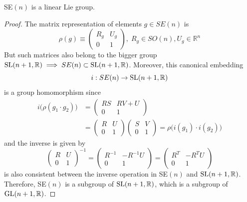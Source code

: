   \begin{proposition}
    SE$(n)$ is a linear Lie group. 
  \end{proposition}
  \begin{proof}
    The matrix representation of elements $g \in SE(n)$ is 
    \begin{equation}
      \rho(g) \equiv \begin{pmatrix}
      R_g & U_g \\ 0 & 1
      \end{pmatrix}, \; R_g \in SO(n), U_g \in \mathbb{R}^n
    \end{equation}
    But such matrices also belong to the bigger group $\operatorname{SL}(n+1, \mathbb{R}) \implies SE(n) \subset \operatorname{SL}(n+1, \mathbb{R})$. Moreover, this canonical embedding 
    \begin{equation}
      i: SE(n) \rightarrow \operatorname{SL}(n+1, \mathbb{R})
    \end{equation}
    is a group homomorphism since
    \begin{align*}
      i\big( \rho(g_1 \cdot g_2) \big) & = \begin{pmatrix}
      RS & RV + U \\ 0 & 1
      \end{pmatrix} \\
      & = \begin{pmatrix}
      R & U \\ 0 & 1
      \end{pmatrix} \begin{pmatrix}
      S & V \\ 0 & 1
      \end{pmatrix} = \rho \big( i(g_1) \cdot i(g_2) \big) 
    \end{align*}
    and the inverse is given by 
    \begin{equation}
      \begin{pmatrix}
      R & U \\ 0 & 1
      \end{pmatrix}^{-1} = \begin{pmatrix}
      R^{-1} & - R^{-1} U \\ 0 & 1
      \end{pmatrix} = \begin{pmatrix}
      R^T & - R^T U \\ 0 & 1
      \end{pmatrix}
    \end{equation}
    is also consistent between the inverse operation in SE$(n)$ and $\operatorname{SL}(n+1, \mathbb{R})$. Therefore, SE$(n)$ is a subgroup of $\operatorname{SL}(n+1, \mathbb{R})$, which is a subgroup of $\operatorname{GL}(n+1, \mathbb{R})$. 
  \end{proof}

